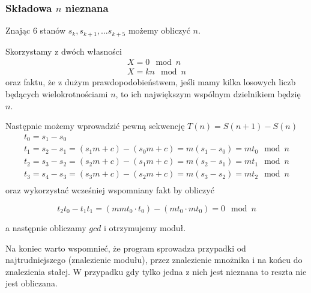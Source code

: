 \subsubsection*{Składowa $n$ nieznana}
Znając $6$ stanów $s_k, s_{k+1},\ldots s_{k+5}$ możemy obliczyć $n$.

Skorzystamy z dwóch własności
\begin{align}
    X = 0 \mod n \\
    X = kn \mod n
\end{align}
oraz faktu, że z dużym prawdopodobieństwem, jeśli mamy kilka losowych liczb będących wielokrotnościami $n$, to ich największym wspólnym dzielnikiem będzię $n$.

Następnie możemy wprowadzić pewną sekwencję $T(n) = S(n+1) - S(n)$
\begin{align*}
    t_0 = s_1 - s_0 \\
    t_1 = s_2 - s_1 = (s_1m+c) - (s_0m+c) = m(s_1 - s_0) = mt_0 \mod n \\
    t_2 = s_3 - s_2 = (s_2m+c) - (s_1m+c) = m(s_2 - s_1) = mt_1 \mod n \\
    t_3 = s_4 - s_3 = (s_3m+c) - (s_2m+c) = m(s_3 - s_2) = mt_2 \mod n \\
\end{align*}
oraz wykorzystać wcześniej wspomniany fakt by obliczyć

$$ t_2 t_0 - t_1 t_1 = (mmt_0 \cdot t_0) - (mt_0 \cdot mt_0) = 0 \mod n $$

a następnie obliczamy $gcd$ i otrzymujemy moduł.

Na koniec warto wspomnieć, że program sprowadza przypadki od najtrudniejszego (znalezienie modułu), przez znalezienie mnożnika i na końcu do znalezienia stałej. W przypadku gdy tylko jedna z nich jest nieznana to reszta nie jest obliczana.